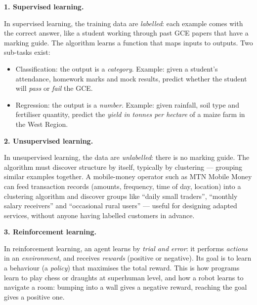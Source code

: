 \documentclass[11pt]{article}
\newcommand{\cle}[1]{{\popxbold\color{popdark}#1}}
\begin{document}
\textbf{1. Supervised learning.}\par
In \cle{supervised learning}, the training data are \emph{labelled}: each example comes with the correct answer, like a student working through past GCE papers that have a marking guide. The algorithm learns a function that maps inputs to outputs. Two sub-tasks exist:
\begin{itemize}
\item \cle{Classification}: the output is a \emph{category}. Example: given a student's attendance, homework marks and mock results, predict whether the student will \emph{pass} or \emph{fail} the GCE.
\item \cle{Regression}: the output is a \emph{number}. Example: given rainfall, soil type and fertiliser quantity, predict the \emph{yield in tonnes per hectare} of a maize farm in the West Region.
\end{itemize}

\textbf{2. Unsupervised learning.}\par
In \cle{unsupervised learning}, the data are \emph{unlabelled}: there is no marking guide. The algorithm must discover structure by itself, typically by \cle{clustering} --- grouping similar examples together. A mobile-money operator such as MTN Mobile Money can feed transaction records (amounts, frequency, time of day, location) into a clustering algorithm and discover groups like ``daily small traders'', ``monthly salary receivers'' and ``occasional rural users'' --- useful for designing adapted services, without anyone having labelled customers in advance.

\textbf{3. Reinforcement learning.}\par
In \cle{reinforcement learning}, an \cle{agent} learns by \emph{trial and error}: it performs \emph{actions} in an \emph{environment}, and receives \emph{rewards} (positive or negative). Its goal is to learn a behaviour (a \emph{policy}) that maximises the total reward. This is how programs learn to play chess or draughts at superhuman level, and how a robot learns to navigate a room: bumping into a wall gives a negative reward, reaching the goal gives a positive one.
\end{document}

